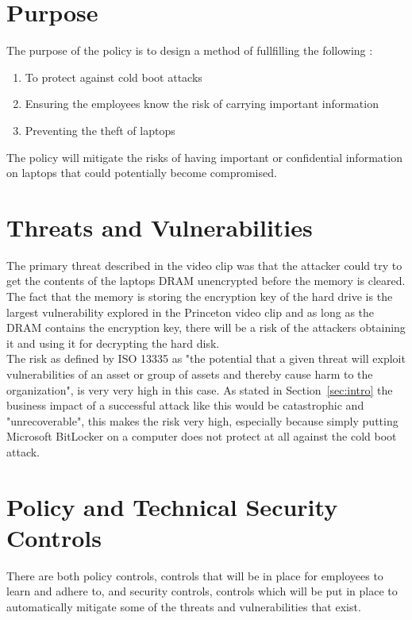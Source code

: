 \documentclass[paper=a4, fontsize=11pt]{scrartcl} %
\numberwithin{equation}{section} %
\numberwithin{figure}{section} %
\numberwithin{table}{section} %
\begin{document}
\section{Purpose}
The purpose of the policy is to design a method of fullfilling the following : 
	\begin{enumerate}
		\item{To protect against cold boot attacks} 
		\item{Ensuring the employees know the risk of carrying important information}
		\item{Preventing the theft of laptops}
	\end{enumerate}
The policy will mitigate the risks of having important or confidential information on laptops that could potentially become compromised.  

\section{Threats and Vulnerabilities}
The primary threat described in the video clip was that the attacker could try to get the contents of the laptops DRAM unencrypted before the memory is cleared.  The fact that the memory is storing the encryption key of the hard drive is the largest vulnerability explored in the Princeton video clip and as long as the DRAM contains the encryption key, there will be a risk of the attackers obtaining it and using it for decrypting the hard disk.\\

The risk as defined by ISO 13335 as "the potential that a given threat will exploit vulnerabilities of an asset or group of assets and thereby cause harm to the organization", is very very high in this case.  As stated in Section~\ref{sec:intro} the business impact of a successful attack like this would be catastrophic and "unrecoverable", this makes the risk very high, especially because simply putting Microsoft BitLocker on a computer does not protect at all against the cold boot attack. \\

\section{Policy and Technical Security Controls}
There are both policy controls, controls that will be in place for employees to learn and adhere to, and security controls, controls which will be put in place to automatically mitigate some of the threats and vulnerabilities that exist.\\
\end{document}
